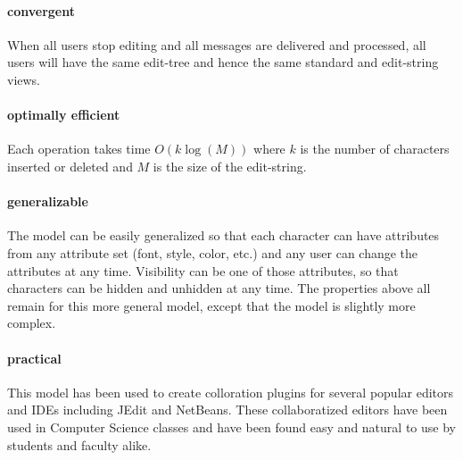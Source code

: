 \documentclass{amsart}
\begin{document}
\paragraph{\bf convergent} 
When all users stop editing and all messages are delivered and processed, all
users will have the same edit-tree and hence the same standard and edit-string
views.

\paragraph{\bf optimally efficient}
Each operation takes time $O(k\log(M))$ where $k$ is the number of characters
inserted or deleted and $M$ is the size of the edit-string.

\paragraph{\bf generalizable}
The model can be easily generalized so that each character can have attributes
from any attribute set (font, style, color, etc.) and any user can change the
attributes at any time. Visibility can be one of those attributes, so that 
characters can be hidden and unhidden at any time. The properties above 
all remain for this more general model, except that the model is slightly
more complex.

\paragraph{\bf practical} 
This model has been used to create colloration plugins for several
popular editors and IDEs including JEdit and NetBeans. These
collaboratized editors have been used in Computer Science classes
and have been found easy and natural to use by students and faculty
alike.
\end{document}
